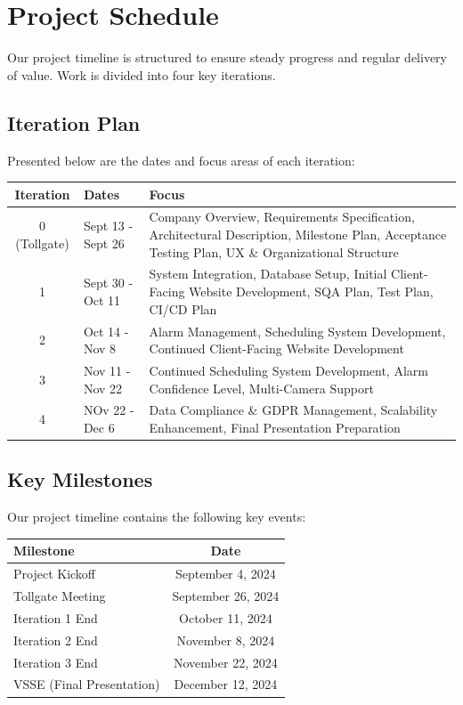 \section{Project Schedule}

Our project timeline is structured to ensure steady progress and regular delivery of value. Work is divided into four key iterations.

\subsection{Iteration Plan}
Presented below are the dates and focus areas of each iteration: 
\begin{center}
    \begin{tabular}{|c|l|l|}
        \hline
        \textbf{Iteration} & \textbf{Dates} & \textbf{Focus} \\
        \hline
        0 (Tollgate) & Sept 13 - Sept 26 & Company Overview, Requirements Specification, Architectural Description, Milestone Plan, Acceptance Testing Plan, UX \& Organizational Structure \\
        \hline
        1 & Sept 30 - Oct 11 & System Integration, Database Setup, Initial Client-Facing Website Development, SQA Plan, Test Plan, CI/CD Plan \\
        \hline
        2 & Oct 14 - Nov 8 & Alarm Management, Scheduling System Development, Continued Client-Facing Website Development \\
        \hline
        3 & Nov 11 - Nov 22 & Continued Scheduling System Development, Alarm Confidence Level, Multi-Camera Support \\
        \hline
        4 & NOv 22 - Dec 6 & Data Compliance \& GDPR Management, Scalability Enhancement, Final Presentation Preparation \\
        \hline
    \end{tabular}
    \end{center}


\subsection{Key Milestones}

Our project timeline contains the following key events:

\begin{center}
\begin{tabular}{|l|c|}
    \hline
    \textbf{Milestone} & \textbf{Date} \\
    \hline
    Project Kickoff & September 4, 2024 \\
    Tollgate Meeting & September 26, 2024 \\
    Iteration 1 End & October 11, 2024 \\
    Iteration 2 End & November 8, 2024 \\
    Iteration 3 End & November 22, 2024 \\
    VSSE (Final Presentation) & December 12, 2024 \\
    \hline
\end{tabular}
\end{center}


